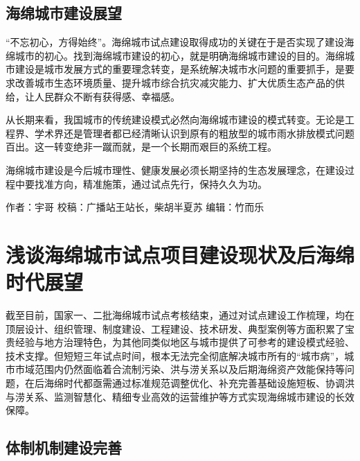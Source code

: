 \documentclass[
]{book}
\begin{document}
\hypertarget{ux6d77ux7ef5ux57ceux5e02ux5efaux8bbeux5c55ux671b}{%
\subsection{海绵城市建设展望}\label{ux6d77ux7ef5ux57ceux5e02ux5efaux8bbeux5c55ux671b}}

``不忘初心，方得始终''。海绵城市试点建设取得成功的关键在于是否实现了建设海绵城市的初心。找到海绵城市建设的初心，就是明确海绵城市建设的目的。海绵城市建设是城市发展方式的重要理念转变，是系统解决城市水问题的重要抓手，是要求改善城市生态环境质量、提升城市综合抗灾减灾能力、扩大优质生态产品的供给，让人民群众不断有获得感、幸福感。

从长期来看，我国城市的传统建设模式必然向海绵城市建设的模式转变。无论是工程界、学术界还是管理者都已经清晰认识到原有的粗放型的城市雨水排放模式问题百出。这一转变绝非一蹴而就，是一个长期而艰巨的系统工程。

海绵城市建设是今后城市理性、健康发展必须长期坚持的生态发展理念，在建设过程中要找准方向，精准施策，通过试点先行，保持久久为功。

作者：宇哥
校稿：广播站王站长，柴胡半夏苏
编辑：竹而乐

\hypertarget{ux6d45ux8c08ux6d77ux7ef5ux57ceux5e02ux8bd5ux70b9ux9879ux76eeux5efaux8bbeux73b0ux72b6ux53caux540eux6d77ux7ef5ux65f6ux4ee3ux5c55ux671b}{%
\section{浅谈海绵城市试点项目建设现状及后海绵时代展望}\label{ux6d45ux8c08ux6d77ux7ef5ux57ceux5e02ux8bd5ux70b9ux9879ux76eeux5efaux8bbeux73b0ux72b6ux53caux540eux6d77ux7ef5ux65f6ux4ee3ux5c55ux671b}}

截至目前，国家一、二批海绵城市试点考核结束，通过对试点建设工作梳理，均在顶层设计、组织管理、制度建设、工程建设、技术研发、典型案例等方面积累了宝贵经验与地方治理特色，为其他同类似地区与城市提供了可参考的建设模式经验、技术支撑。但短短三年试点时间，根本无法完全彻底解决城市所有的``城市病''，城市市域范围内仍然面临着合流制污染、洪与涝关系以及后期海绵资产效能保持等问题，在后海绵时代都亟需通过标准规范调整优化、补充完善基础设施短板、协调洪与涝关系、监测智慧化、精细专业高效的运营维护等方式实现海绵城市建设的长效保障。

\hypertarget{ux4f53ux5236ux673aux5236ux5efaux8bbeux5b8cux5584}{%
\subsection{体制机制建设完善}\label{ux4f53ux5236ux673aux5236ux5efaux8bbeux5b8cux5584}}
\end{document}
